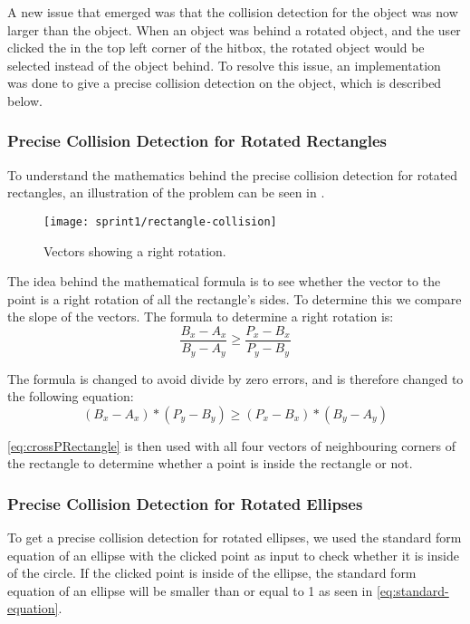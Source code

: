 A new issue that emerged was that the collision detection for the object was now larger than the object.
When an object was behind a rotated object, and the user clicked the in the top left corner of the hitbox, the rotated object would be selected instead of the object behind.
To resolve this issue, an implementation was done to give a precise collision detection on the object, which is described below.

\subsubsection{Precise Collision Detection for Rotated Rectangles}
To understand the mathematics behind the precise collision detection for rotated rectangles, an illustration of the problem can be seen in .

\begin{figure}[h]
	\centering
	\texttt{[image: sprint1/rectangle-collision]}
	\caption{Vectors showing a right rotation.}
	\label{figure:rectangle-collision}
\end{figure}

The idea behind the mathematical formula is to see whether the vector to the point is a right rotation of all the rectangle's sides.
To determine this we compare the slope of the vectors.
The formula to determine a right rotation is:
\begin{equation}
	\frac{B_x-A_x}{B_y-A_y} \geq \frac{P_x-B_x}{P_y-B_y}
\end{equation}

The formula is changed to avoid divide by zero errors, and is therefore changed to the following equation:
\begin{equation}\label{eq:crossPRectangle}
	(B_x-A_x)*(P_y-B_y) \geq (P_x-B_x)*(B_y-A_y)
\end{equation} 

\eqref{eq:crossPRectangle} is then used with all four vectors of neighbouring corners of the rectangle to determine whether a point is inside the rectangle or not.

\subsubsection{Precise Collision Detection for Rotated Ellipses}
To get a precise collision detection for rotated ellipses, we used the standard form equation of an ellipse with the clicked point as input to check whether it is inside of the circle.
If the clicked point is inside of the ellipse, the standard form equation of an ellipse will be smaller than or equal to 1 as seen in \eqref{eq:standard-equation}.

